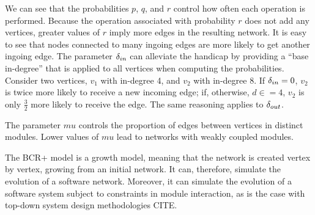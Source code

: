 We can see that the probabilities $p$, $q$, and $r$ control how often each
operation is performed. Because the operation associated with probability $r$
does not add any vertices, greater values of $r$ imply more edges in the
resulting network. It is easy to see that nodes connected to many ingoing edges
are more likely to get another ingoing edge. The parameter $\delta_{in}$ can alleviate
the handicap by providing a ``base in-degree'' that is applied to all vertices
when computing the probabilities. Consider two vertices, $v_1$ with in-degree 4,
and $v_2$ with in-degree 8. If $\delta_{in} = 0$, $v_2$ is twice more likely to receive
a new incoming edge; if, otherwise, $d\in = 4$, $v_2$ is only $\frac{3}{2}$ more
likely to receive the edge. The same reasoning applies to $\delta_{out}$.

The parameter $mu$ controls the proportion of edges between vertices in distinct
modules. Lower values of $mu$ lead to networks with weakly coupled modules.

The BCR+ model is a growth model, meaning that the network is created vertex by
vertex, growing from an initial network. It can, therefore, simulate the
evolution of a software network. Moreover, it can simulate the evolution of a
software system subject to constraints in module interaction, as is the case
with top-down system design methodologies CITE.

%
%
%
%

